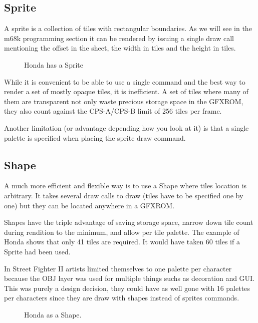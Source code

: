 \subsection{Sprite}
A sprite is a collection of tiles with rectangular boundaries. As we will see in the m68k programming section it can be rendered by issuing a single draw call mentioning the offset in the sheet, the width in tiles and the height in tiles.

 \begin{figure}[H]
\caption*{Honda has a Sprite}
\end{figure}

While it is convenient to be able to use a single command and the best way to render a set of mostly opaque tiles, it is inefficient. A set of tiles where many of them are transparent not only waste precious storage space in the GFXROM, they also count against the CPS-A/CPS-B limit of 256 tiles per frame.

Another limitation (or advantage depending how you look at it) is that a single palette is specified when placing the sprite draw command.

\subsection{Shape}

A much more efficient and flexible way is to use a Shape where tiles location is arbitrary. It takes several draw calls to draw (tiles have to be specified one by one) but they can be located anywhere in a GFXROM.

Shapes have the triple advantage of saving storage space, narrow down tile count during rendition to the minimum, and allow per tile palette. The example of Honda shows that only 41 tiles are required. It would have taken 60 tiles if a Sprite had been used.

\begin{trivia}
In Street Fighter II artists limited themselves to one palette per character because the OBJ layer was used for multiple things suchs as decoration and GUI. This was purely a design decision, they could have as well gone with 16 palettes per characters since they are draw with shapes instead of sprites commands. 
\end{trivia}

 \begin{figure}[H]
\caption*{Honda as a Shape.}
\end{figure}


